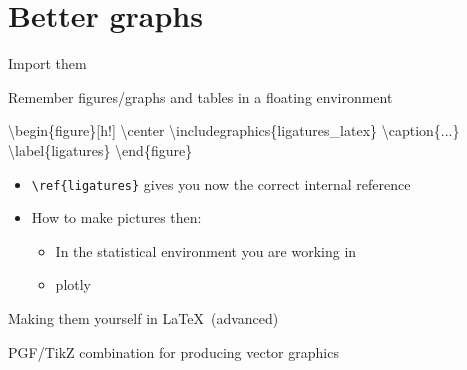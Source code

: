 \documentclass[ignorenonframetext,]{beamer}
\newenvironment{Shaded}{\begin{snugshade}}{\end{snugshade}}
\newcommand{\CommentTok}[1]{\textcolor[rgb]{0.56,0.35,0.01}{\textit{{#1}}}}
\newcommand{\NormalTok}[1]{{#1}}
\begin{document}
\section{Better graphs}\label{better-graphs}

\begin{frame}[fragile]{Import them}

Remember figures/graphs and tables in a floating environment

\begin{Shaded}
\begin{Highlighting}[]
\NormalTok{\textbackslash{}begin\{figure\}[h!] }
    \NormalTok{\textbackslash{}center }
        \NormalTok{\textbackslash{}includegraphics\{ligatures_latex\} }
    \NormalTok{\textbackslash{}caption\{...\} }
    \NormalTok{\textbackslash{}label\{ligatures\}}
\NormalTok{\textbackslash{}end\{figure\}}
\end{Highlighting}
\end{Shaded}

\begin{itemize}
\itemsep1pt\parskip0pt
\item
  \texttt{\textbackslash{}ref\{ligatures\}} gives you now the correct
  internal reference
\item
  How to make pictures then:

  \begin{itemize}
  \itemsep1pt\parskip0pt
  \item
    In the statistical environment you are working in
  \item
    plotly
  \end{itemize}
\end{itemize}

\end{frame}

\begin{frame}[fragile]{Making them yourself in \LaTeX~(advanced)}

PGF/TikZ combination for producing vector graphics

\begin{Shaded}
\end{Shaded}

\end{frame}
\end{document}
